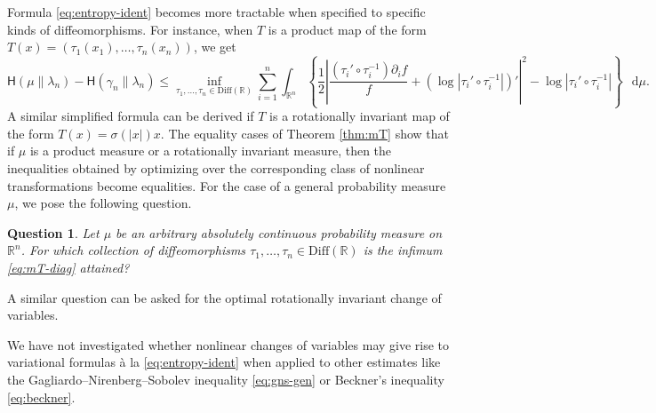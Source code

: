 \documentclass[a4paper,twoside,11pt,reqno]{amsart}
\newtheorem{question}[theorem]{Question}
\newcommand*\diff{\mathop{}\!\mathrm{d}}
\newcommand{\R}{\mathbb{R}} %
\newcommand{\mr}{\mathrm}
\newcommand{\HH}{\mathsf{H}}
\begin{document}
Formula \eqref{eq:entropy-ident} becomes more tractable when specified to specific kinds of diffeomorphisms. For instance, when $T$ is a product map of the form $T(x)=(\tau_1(x_1),\ldots,\tau_n(x_n))$, we get
\begin{equation} \label{eq:mT-diag}
\HH(\mu\|\lambda_n)-\HH(\gamma_n\|\lambda_n) \leq \inf_{\tau_1,\ldots,\tau_n\in\mr{Diff}(\R)}  \sum_{i=1}^n\int_{\R^n} \left\{\frac{1}{2}\left| \frac{(\tau_i'\circ\tau_i^{-1}) \partial_i f}{f} +( \log |\tau_i'\circ\tau_i^{-1}|)' \right|^2 - \log|\tau_i'\circ\tau_i^{-1}| \right\} \,\diff\mu.
\end{equation}
A similar simplified formula can be derived if $T$ is a rotationally invariant map of the form $T(x) = \sigma(|x|) x$. The equality cases of Theorem \ref{thm:mT} show that if $\mu$ is a product measure or a rotationally invariant measure, then the inequalities obtained by optimizing over the corresponding class of nonlinear transformations become equalities. For the case of a general probability measure $\mu$, we pose the following question.

\begin{question}
Let $\mu$ be an arbitrary absolutely continuous probability measure on $\R^n$. For which collection of diffeomorphisms $\tau_1,\ldots,\tau_n\in\mr{Diff}(\R)$ is the infimum \eqref{eq:mT-diag} attained?
\end{question}

A similar question can be asked for the optimal rotationally invariant change of variables.

We have not investigated whether nonlinear changes of variables may give rise to variational formulas \`a la \eqref{eq:entropy-ident} when applied to other estimates like the Gagliardo--Nirenberg--Sobolev inequality \eqref{eq:gns-gen} or Beckner's inequality \eqref{eq:beckner}.




\end{document}
